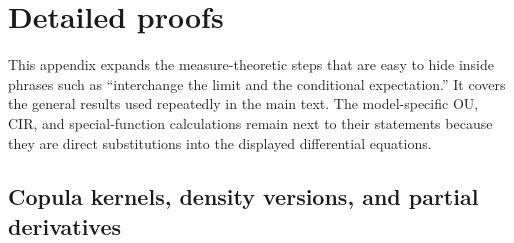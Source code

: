 \section{Detailed proofs}
\label{rev:sec-detailed-proofs}

This appendix expands the measure-theoretic steps that are easy to hide inside
phrases such as ``interchange the limit and the conditional expectation.''
It covers the general results used repeatedly in the main text.  The
model-specific OU, CIR, and special-function calculations remain next to their
statements because they are direct substitutions into the displayed
differential equations.

\subsection{Copula kernels, density versions, and partial derivatives}
\label{rev:app-copula-kernel-proof}

